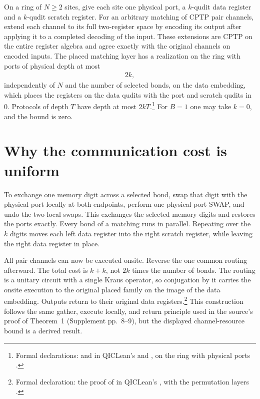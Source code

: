 \documentclass{article}
\begin{document}
On a ring of $N\ge2$ sites, give each site one physical port, a $k$-qudit
data register and a $k$-qudit scratch register. For an arbitrary matching
of CPTP pair channels, extend each channel to its full two-register space
by encoding its output after applying it to a completed decoding of the
input. These extensions are CPTP on the entire register algebra and agree
exactly with the original channels on encoded inputs. The placed matching
layer has a realization on the ring with ports of physical depth at most
\begin{align}
    2k,
\end{align}
independently of $N$ and the number of selected bonds, on the data
embedding, which places the registers on the data qudits with the port and
scratch qudits in $0$. Protocols of depth $T$ have depth at most
$2kT$.\footnote{Formal declarations:
     and
     in QICLean's
     and
    , on the ring with physical
    ports .}
For $B=1$ one may take $k=0$, and the bound is zero.

\section{Why the communication cost is uniform}
To exchange one memory digit across a selected bond, swap that digit with
the physical port locally at both endpoints, perform one physical-port
SWAP, and undo the two local swaps. This exchanges the selected memory
digits and restores the ports exactly. Every bond of a matching runs in
parallel. Repeating over the $k$ digits moves each left data register into
the right scratch register, while leaving the right data register in place.

All pair channels can now be executed onsite. Reverse the one common
routing afterward. The total cost is $k+k$, not $2k$ times the number of
bonds. The routing is a unitary circuit with a single Kraus operator, so
conjugation by it carries the onsite execution to the original placed
family on the image of the data embedding. Outputs return to their original
data registers.\footnote{Formal declaration: the proof of
     in QICLean's
    , with the permutation layers
    .}
This construction follows the same gather, execute locally, and return
principle used in the source's proof of Theorem~1 (Supplement pp.~8--9),
but the displayed channel-resource bound is a derived result.
\end{document}
